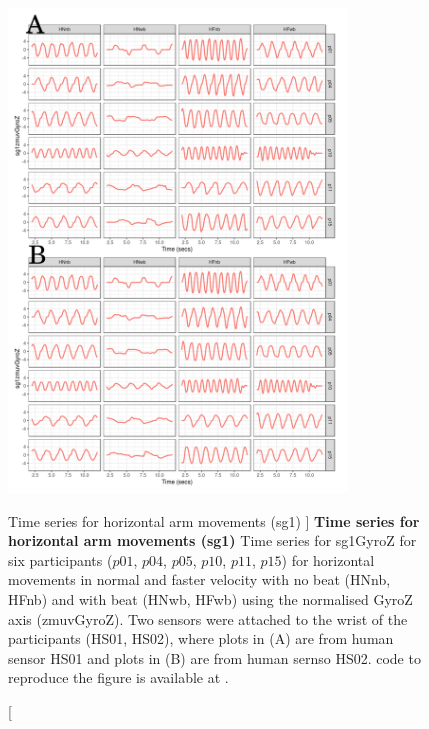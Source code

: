 \begin{figure}
\centering
\includegraphics[width=0.8\textwidth]{ts_H_sg1}
    	\caption
	[Time series for horizontal arm movements (sg1) ]{
	{\bf Time series for horizontal arm movements (sg1)}
		Time series for sg1GyroZ for six participants 
		($p01$, $p04$, $p05$, $p10$, $p11$, $p15$) 
		for horizontal movements in normal and faster velocity with
		no beat	(HNnb, HFnb) and with beat (HNwb, HFwb) using 
		the normalised GyroZ axis (zmuvGyroZ).
		Two sensors were attached to the wrist of the participants (HS01, HS02),
		where plots in (A) are from human sensor HS01 and
		plots in (B) are from human sernso HS02.
	\R code to reproduce the figure is available at 
	.
        }
    \label{fig:tssg1gyroZ-hii}
\end{figure}


